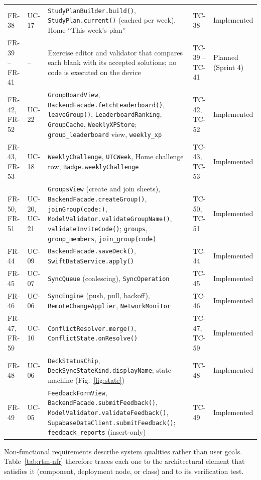 \documentclass[12pt,letterpaper]{article}
\begin{document}
\begin{xltabular}{\textwidth}{@{}l L{1.6cm} Y L{2.0cm} L{1.9cm}@{}}
FR-38 & UC-17 & \texttt{StudyPlanBuilder.build()}, \texttt{StudyPlan.current()} (cached per week), Home ``This week's plan'' & TC-38 & Implemented \\
FR-39 -- FR-41 & -- & Exercise editor and validator that compares each blank with its accepted solutions; no code is executed on the device & TC-39 -- TC-41 & Planned (Sprint 4) \\
FR-42, FR-52 & UC-22 & \texttt{GroupBoardView}, \texttt{BackendFacade.fetchLeaderboard()}, \texttt{leaveGroup()}, \texttt{LeaderboardRanking}, \texttt{GroupCache}, \texttt{WeeklyXPStore}; \texttt{group\_leaderboard} view, \texttt{weekly\_xp} & TC-42, TC-52 & Implemented \\
FR-43, FR-53 & UC-18 & \texttt{WeeklyChallenge}, \texttt{UTCWeek}, Home challenge row, \texttt{Badge.weeklyChallenge} & TC-43, TC-53 & Implemented \\
FR-50, FR-51 & UC-20, UC-21 & \texttt{GroupsView} (create and join sheets), \texttt{BackendFacade.createGroup()}, \texttt{joinGroup(code:)}, \texttt{ModelValidator.validateGroupName()}, \texttt{validateInviteCode()}; \texttt{groups}, \texttt{group\_members}, \texttt{join\_group(code)} & TC-50, TC-51 & Implemented \\
FR-44 & UC-09 & \texttt{BackendFacade.saveDeck()}, \texttt{SwiftDataService.apply()} & TC-44 & Implemented \\
FR-45 & UC-07 & \texttt{SyncQueue} (coalescing), \texttt{SyncOperation} & TC-45 & Implemented \\
FR-46 & UC-06 & \texttt{SyncEngine} (push, pull, backoff), \texttt{RemoteChangeApplier}, \texttt{NetworkMonitor} & TC-46 & Implemented \\
FR-47, FR-59 & UC-10 & \texttt{ConflictResolver.merge()}, \texttt{ConflictState.onResolve()} & TC-47, TC-59 & Implemented \\
FR-48 & UC-06 & \texttt{DeckStatusChip}, \texttt{DeckSyncStateKind.displayName}; state machine (Fig.~\ref{fig:state}) & TC-48 & Implemented \\
FR-49 & UC-05 & \texttt{FeedbackFormView}, \texttt{BackendFacade.submitFeedback()}, \texttt{ModelValidator.validateFeedback()}, \texttt{SupabaseDataClient.submitFeedback()}; \texttt{feedback\_reports} (insert-only) & TC-49 & Implemented \\
\end{xltabular}

Non-functional requirements describe system qualities rather than user goals.
Table~\ref{tab:rtm-nfr} therefore traces each one to the architectural element that
satisfies it (component, deployment node, or class) and to its verification test.
\end{document}
